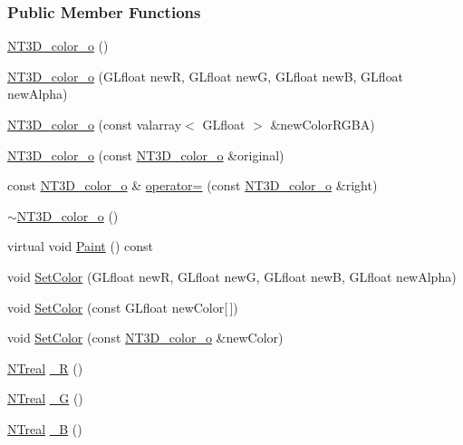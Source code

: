 \subsubsection*{Public Member Functions}
\begin{DoxyCompactItemize}
\item 
\hyperlink{class_n_t3_d__color__o_a59e3a0c0633df3114a0beda2054972ef}{NT3D\_\-color\_\-o} ()
\item 
\hyperlink{class_n_t3_d__color__o_a8b53802855908e8ebc4cdfc04082e3c5}{NT3D\_\-color\_\-o} (GLfloat newR, GLfloat newG, GLfloat newB, GLfloat newAlpha)
\item 
\hyperlink{class_n_t3_d__color__o_ac460c8eca498cf8c52fee51f64a25fbb}{NT3D\_\-color\_\-o} (const valarray$<$ GLfloat $>$ \&newColorRGBA)
\item 
\hyperlink{class_n_t3_d__color__o_ad766301bba9fab28502463d615d8f02d}{NT3D\_\-color\_\-o} (const \hyperlink{class_n_t3_d__color__o}{NT3D\_\-color\_\-o} \&original)
\item 
const \hyperlink{class_n_t3_d__color__o}{NT3D\_\-color\_\-o} \& \hyperlink{class_n_t3_d__color__o_a6f2bfd2b6f50804151df046c0c2aa611}{operator=} (const \hyperlink{class_n_t3_d__color__o}{NT3D\_\-color\_\-o} \&right)
\item 
\hyperlink{class_n_t3_d__color__o_a10dccf5f4bff4a7ac8dd48dc46b9f5b2}{$\sim$NT3D\_\-color\_\-o} ()
\item 
virtual void \hyperlink{class_n_t3_d__color__o_a4dec5640206c3ac38669363b6a1fbd39}{Paint} () const 
\item 
void \hyperlink{class_n_t3_d__color__o_a48c5c1e162255c0b100046e98f0d18be}{SetColor} (GLfloat newR, GLfloat newG, GLfloat newB, GLfloat newAlpha)
\item 
void \hyperlink{class_n_t3_d__color__o_a7d0554f84d167986700d102f1c0ef047}{SetColor} (const GLfloat newColor\mbox{[}$\,$\mbox{]})
\item 
void \hyperlink{class_n_t3_d__color__o_aeb5da422cfc1e027a0c5840af7b846c4}{SetColor} (const \hyperlink{class_n_t3_d__color__o}{NT3D\_\-color\_\-o} \&newColor)
\item 
\hyperlink{nt__types_8h_a814a97893e9deb1eedcc7604529ba80d}{NTreal} \hyperlink{class_n_t3_d__color__o_a37f03e462272144e01357a7ef6a40bcf}{\_\-R} ()
\item 
\hyperlink{nt__types_8h_a814a97893e9deb1eedcc7604529ba80d}{NTreal} \hyperlink{class_n_t3_d__color__o_aae214e50e8d1b730599370f668334f52}{\_\-G} ()
\item 
\hyperlink{nt__types_8h_a814a97893e9deb1eedcc7604529ba80d}{NTreal} \hyperlink{class_n_t3_d__color__o_add822bfe43272e52cb755b6245f2d07b}{\_\-B} ()

\end{DoxyCompactItemize}
